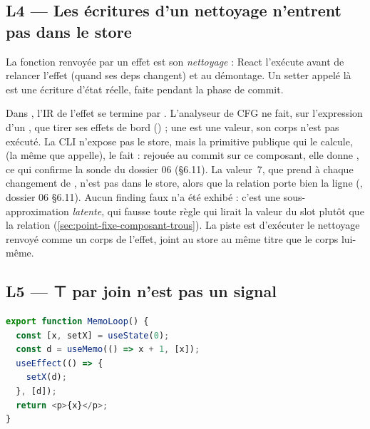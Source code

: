 \subsection{L4 --- Les écritures d'un nettoyage n'entrent pas dans le store}

\begin{react}
La fonction renvoyée par un effet est son \emph{nettoyage} : React l'exécute avant de relancer l'effet (quand ses deps changent) et au démontage. Un setter appelé là est une écriture d'état réelle, faite pendant la phase de commit.
\end{react}

Dans , l'IR de l'effet se termine par . L'analyseur de CFG ne fait, sur l'expression d'un , que tirer ses effets de bord () ; une  est une valeur, son corps n'est pas exécuté.
La CLI n'expose pas le store, mais la primitive publique qui le calcule,  (la même que  appelle), le fait : rejouée au commit \snapshotCommit{} sur ce composant, elle donne , ce qui confirme la sonde du dossier 06 (§6.11). La valeur~7, que  prend à chaque changement de , n'est pas dans le store, alors que la relation  porte bien la ligne (, dossier 06 §6.11). Aucun finding faux n'a été exhibé : c'est une sous-approximation \emph{latente}, qui fausse toute règle qui lirait la valeur du slot plutôt que la relation (\cref{sec:point-fixe-composant-trous}). La piste est d'exécuter le nettoyage renvoyé comme un corps de l'effet, joint au store au même titre que le corps lui-même.

\subsection{L5 --- ⊤ par join n'est pas un signal}
\label{sec:limites-perspectives-top-join}

\begin{lstlisting}[language=TypeScript,caption={\file{/tmp/r27/memo/MemoLoop.tsx}},label={lst:limites-memoloop}]
export function MemoLoop() {
  const [x, setX] = useState(0);
  const d = useMemo(() => x + 1, [x]);
  useEffect(() => {
    setX(d);
  }, [d]);
  return <p>{x}</p>;
}
\end{lstlisting}

